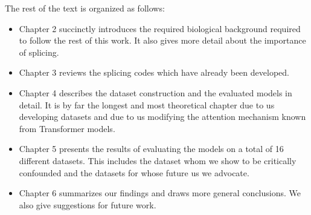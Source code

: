 The rest of the text is organized as follows:
\begin{itemize}
	\item Chapter 2 succinctly introduces the required biological background required to follow the rest of this work. It also gives more detail about the importance of splicing.
	\item Chapter 3 reviews the splicing codes which have already been developed.
	\item Chapter 4 describes the dataset construction and the evaluated models in detail. It is by far the longest and most theoretical chapter due to us developing datasets and due to us modifying the attention mechanism known from Transformer models.
	\item Chapter 5 presents the results of evaluating the models on a total of 16 different datasets. This includes the dataset whom we show to be critically confounded and the datasets for whose future us we advocate.
	\item Chapter 6 summarizes our findings and draws more general conclusions. We also give suggestions for future work.
\end{itemize}
